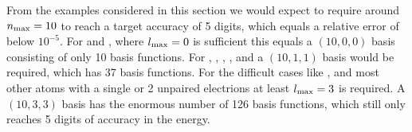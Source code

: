 From the examples considered in this section we would expect to require
around $n_\text{max} = 10$ to reach a target accuracy of 5 digits,
which equals a relative error of below $10^{-5}$.
For  and , where $l_\text{max} = 0$ is sufficient this equals
a $(10,0,0)$ basis consisting of only 10 \CS basis functions.
For , , , ,  and 
a $(10,1,1)$ basis would be required, which has 37 basis functions.
For the difficult cases like ,  and most other atoms
with a single or 2 unpaired electrions
at least $l_\text{max} = 3$ is required.
A $(10,3,3)$ \CS basis has the enormous number of 126 basis functions,
which still only reaches 5 digits of accuracy in the \HF energy.

%

%

